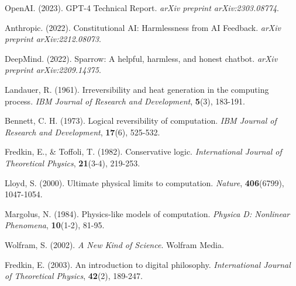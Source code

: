 \documentclass[12pt,a4paper]{article}
\begin{document}
\begin{thebibliography}{99}
OpenAI. (2023). GPT-4 Technical Report. \textit{arXiv preprint arXiv:2303.08774}.

Anthropic. (2022). Constitutional AI: Harmlessness from AI Feedback. \textit{arXiv preprint arXiv:2212.08073}.

DeepMind. (2022). Sparrow: A helpful, harmless, and honest chatbot. \textit{arXiv preprint arXiv:2209.14375}.

Landauer, R. (1961). Irreversibility and heat generation in the computing process. \textit{IBM Journal of Research and Development}, \textbf{5}(3), 183-191.

Bennett, C. H. (1973). Logical reversibility of computation. \textit{IBM Journal of Research and Development}, \textbf{17}(6), 525-532.

Fredkin, E., \& Toffoli, T. (1982). Conservative logic. \textit{International Journal of Theoretical Physics}, \textbf{21}(3-4), 219-253.

Lloyd, S. (2000). Ultimate physical limits to computation. \textit{Nature}, \textbf{406}(6799), 1047-1054.

Margolus, N. (1984). Physics-like models of computation. \textit{Physica D: Nonlinear Phenomena}, \textbf{10}(1-2), 81-95.

Wolfram, S. (2002). \textit{A New Kind of Science}. Wolfram Media.

Fredkin, E. (2003). An introduction to digital philosophy. \textit{International Journal of Theoretical Physics}, \textbf{42}(2), 189-247.

\end{thebibliography}
\end{document}
